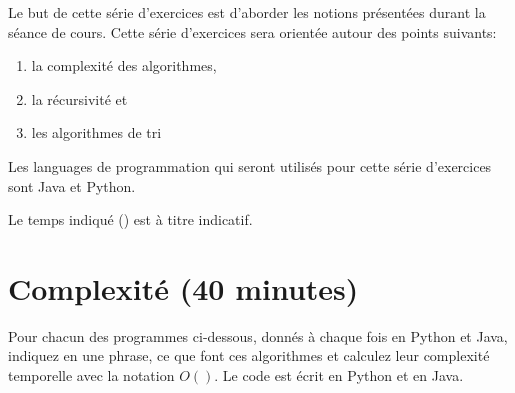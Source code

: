 




\ShowSolutiontrue
\ShowConseiltrue
\titre
{}

Le but de cette série d'exercices est d'aborder les notions présentées durant la séance de cours. Cette série d'exercices sera orientée autour des points suivants:
\begin{enumerate}
    \item la complexité des algorithmes,
    \item la récursivité et
    \item les algorithmes de tri
\end{enumerate}

Les languages de programmation qui seront utilisés pour cette série d'exercices sont Java et Python.

Le temps indiqué (\faClock) est à titre indicatif.


\section{Complexité (40 minutes)}

Pour chacun des programmes ci-dessous, donnés à chaque fois en Python et Java, indiquez en une phrase, ce que font ces algorithmes et calculez leur complexité temporelle avec la notation $O( )$. Le code est écrit en Python et en Java. \\

